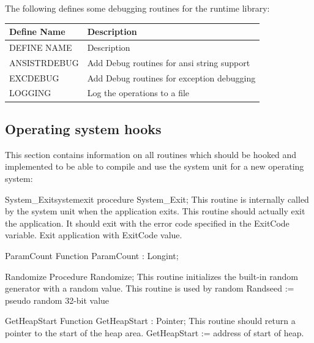 \documentclass [a4paper,12pt]{article}
\begin{document}
The following defines some debugging routines for the runtime library:

\begin{longtable}{|l|p{10cm}|}
\hline
Define Name & Description \\
\hline
\endhead
\hline
\endfoot
DEFINE NAME     & Description \\
ANSISTRDEBUG    & Add Debug routines for ansi string support \\
EXCDEBUG        & Add Debug routines for exception debugging \\
LOGGING         & Log the operations to a file \\
\end{longtable}

\subsection{Operating system hooks}
\label{subsec:operating}

This section contains information on all routines which should be hooked and
implemented to be able to compile and use the system unit for a new
operating system:

\begin{functionl}{System{\_}Exit}{systemexit}
\Declaration
procedure System{\_}Exit;
\Description
This routine is internally called by the system unit when the application
exits.
\Notes
This routine should actually exit the application. It should exit with the
error code specified in the \textsf{ExitCode} variable.
\Algorithm
Exit application with ExitCode value.
\end{functionl}

\begin{function}{ParamCount}
\Declaration
Function ParamCount : Longint;
\end{function}

\begin{procedure}{Randomize}
\Declaration
Procedure Randomize;
\Description
This routine initializes the built-in random generator with a random value.
\Notes
This routine is used by random
\Algorithm
Randseed := pseudo random 32-bit value
\end{procedure}

\begin{function}{GetHeapStart}
\Declaration
Function GetHeapStart : Pointer;
\Description
This routine should return a pointer to the start of the heap area.
\Notes
GetHeapStart := address of start of heap.
\end{function}
\end{document}
